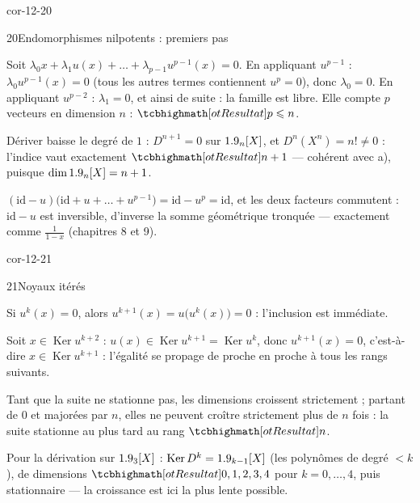 \begin{blocLivre}{cor-12-20}
\begin{corrige}{20}{Endomorphismes nilpotents : premiers pas}
\begin{questions}
  \item Soit $\lambda_0x+\lambda_1u(x)+\dots+\lambda_{p-1}u^{p-1}(x)=0$.
    En appliquant $u^{p-1}$ : $\lambda_0u^{p-1}(x)=0$ (tous les autres
    termes contiennent $u^{p}=0$), donc $\lambda_0=0$. En appliquant
    $u^{p-2}$ : $\lambda_1=0$, et ainsi de suite : la famille est libre.
    Elle compte $p$ vecteurs en dimension $n$ : $\res{p\leqslant n}$.
  \item Dériver baisse le degré de $1$ : $D^{n+1}=0$ sur $1.9_n[X]$, et
    $D^{n}(X^{n})=n!\neq0$ : l'indice vaut exactement $\res{n+1}$ —
    cohérent avec a), puisque $\dim1.9_n[X]=n+1$.
  \item $(\mathrm{id}-u)\bigl(\mathrm{id}+u+\dots+u^{p-1}\bigr)
    =\mathrm{id}-u^{p}=\mathrm{id}$, et les deux facteurs commutent :
    $\mathrm{id}-u$ est inversible, d'inverse la somme géométrique
    tronquée — exactement comme $\frac{1}{1-x}$ (chapitres 8 et 9).
\end{questions}
\end{corrige}
\end{blocLivre}

\begin{blocLivre}{cor-12-21}
\begin{corrige}{21}{Noyaux itérés}
\begin{questions}
  \item Si $u^{k}(x)=0$, alors $u^{k+1}(x)=u\bigl(u^{k}(x)\bigr)=0$ :
    l'inclusion est immédiate.
  \item Soit $x\in\operatorname{Ker}u^{k+2}$ : $u(x)\in\operatorname{Ker}u^{k+1}
    =\operatorname{Ker}u^{k}$, donc $u^{k+1}(x)=0$, c'est-à-dire
    $x\in\operatorname{Ker}u^{k+1}$ : l'égalité se propage de proche en
    proche à tous les rangs suivants.
  \item Tant que la suite ne stationne pas, les dimensions croissent
    strictement ; partant de $0$ et majorées par $n$, elles ne peuvent
    croître strictement plus de $n$ fois : la suite stationne au plus tard
    au rang $\res{n}$.
  \item Pour la dérivation sur $1.9_3[X]$ :
    $\operatorname{Ker}D^{k}=1.9_{k-1}[X]$ (les polynômes de degré
    $<k$), de dimensions $\res{0,1,2,3,4}$ pour $k=0,\dots,4$, puis
    stationnaire — la croissance est ici la plus lente possible.
\end{questions}
\end{corrige}
\end{blocLivre}

